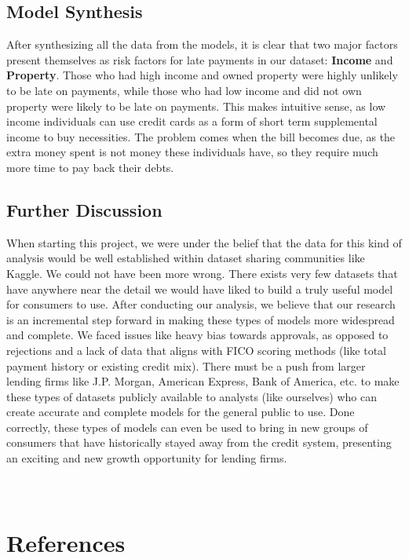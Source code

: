 \documentclass[12pt]{article}
\begin{document}
\subsection{Model Synthesis}
After synthesizing all the data from the models, it is clear that two major factors present themselves as risk factors for late payments in our dataset: \textbf{Income} and \textbf{Property}. Those who had high income and owned property were highly unlikely to be late on payments, while those who had low income and did not own property were likely to be late on payments. This makes intuitive sense, as low income individuals can use credit cards as a form of short term supplemental income to buy necessities. The problem comes when the bill becomes due, as the extra money spent is not money these individuals have, so they require much more time to pay back their debts.

\subsection{Further Discussion}
When starting this project, we were under the belief that the data for this kind of analysis would be well established within dataset sharing communities like Kaggle. We could not have been more wrong. There exists very few datasets that have anywhere near the detail we would have liked to build a truly useful model for consumers to use. After conducting our analysis, we believe that our research is an incremental step forward in making these types of models more widespread and complete. We faced issues like heavy bias towards approvals, as opposed to rejections and a lack of data that aligns with FICO scoring methods (like total payment history or existing credit mix). There must be a push from larger lending firms like J.P. Morgan, American Express, Bank of America, etc. to make these types of datasets publicly available to analysts (like ourselves) who can create accurate and complete models for the general public to use. Done correctly, these types of models can even be used to bring in new groups of consumers that have historically stayed away from the credit system, presenting an exciting and new growth opportunity for lending firms. 
\\
\\
\\
\section{References}
\end{document}
